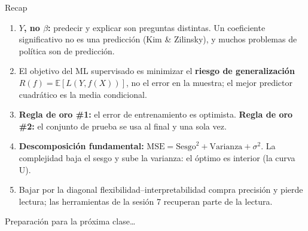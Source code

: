 \documentclass{beamer}
\newcommand{\E}{\mathbb{E}}
\newcommand{\1}{\mathbb{I}}
\newcommand{\MSE}{\mathrm{MSE}}
\begin{document}
\begin{frame}{Recap}
\small
\begin{enumerate}\itemsep7pt
  \item \textbf{$Y$, no $\beta$:} predecir y explicar son preguntas distintas. Un coeficiente significativo no es una predicción (Kim \& Zilinsky), y muchos problemas de política son de predicción.
  \item El objetivo del ML supervisado es minimizar el \textbf{riesgo de generalización} $R(f) = \E[L(Y, f(X))]$, no el error en la muestra; el mejor predictor cuadrático es la media condicional.
  \item \textbf{Regla de oro \#1:} el error de entrenamiento es optimista. \textbf{Regla de oro \#2:} el conjunto de prueba se usa al final y una sola vez.
  \item \textbf{Descomposición fundamental:} $\MSE = \text{Sesgo}^2 + \text{Varianza} + \sigma^2$. La complejidad baja el sesgo y sube la varianza: el óptimo es interior (la curva U).
  \item Bajar por la diagonal flexibilidad--interpretabilidad compra precisión y pierde lectura; las herramientas de la sesión 7 recuperan parte de la lectura.
\end{enumerate}
\end{frame}

\begin{frame}
\vspace{2.0cm}
\Large{Preparación para la próxima clase\ldots}
\end{frame}

\end{document}
